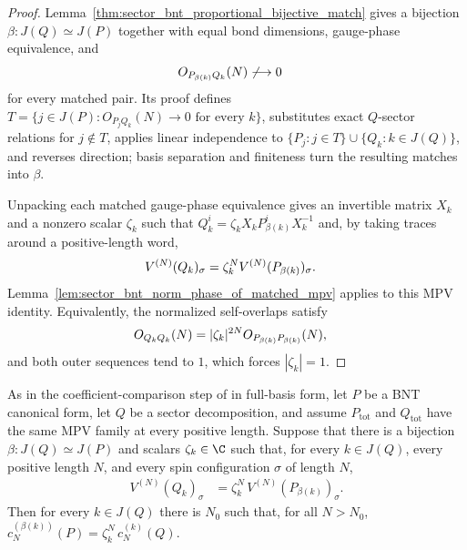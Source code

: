 \begin{proof}\leanok
    Lemma~\ref{thm:sector_bnt_proportional_bijective_match} gives a bijection
    $\beta:J(Q)\simeq J(P)$ together with equal bond dimensions, gauge-phase
    equivalence, and
    \begin{align}
        O_{P_{\beta(k)}Q_k}(N)
         & \not\longrightarrow 0
        \notag
    \end{align}
    for every matched pair. Its proof defines
    $T=\{j\in J(P):O_{P_jQ_k}(N)\to0\text{ for every }k\}$, substitutes exact
    $Q$-sector relations for $j\notin T$, applies linear independence to
    $\{P_j:j\in T\}\cup\{Q_k:k\in J(Q)\}$, and reverses direction; basis
    separation and finiteness turn the resulting matches into $\beta$.

    Unpacking each matched gauge-phase equivalence gives an invertible matrix
    $X_k$ and a nonzero scalar $\zeta_k$ such that
    $Q_k^i=\zeta_kX_kP_{\beta(k)}^iX_k^{-1}$ and, by taking traces around a
    positive-length word,
    \begin{align}
        V^{(N)}(Q_k)_\sigma
         & =\zeta_k^N V^{(N)}(P_{\beta(k)})_\sigma.
        \notag
    \end{align}
    Lemma~\ref{lem:sector_bnt_norm_phase_of_matched_mpv} applies to this MPV
    identity. Equivalently, the normalized self-overlaps satisfy
    \begin{align}
        O_{Q_kQ_k}(N)
         & =|\zeta_k|^{2N}O_{P_{\beta(k)}P_{\beta(k)}}(N),
        \notag
    \end{align}
    and both outer sequences tend to $1$, which forces $|\zeta_k|=1$.
\end{proof}

\begin{lemma}%
    \label{lem:sector_bnt_coeff_identity_via_matched_mpv_phase}
    \leanok
    As in the coefficient-comparison step of
    \cite[Appendix MPV proof, lines~1187--1188]{Cirac2016MPDO_arXiv} in
    full-basis form, let $P$ be a BNT canonical form, let $Q$ be a sector
    decomposition, and assume $P_{\mathrm{tot}}$ and $Q_{\mathrm{tot}}$ have
    the same MPV family at every positive length.
    Suppose that there is a bijection $\beta:J(Q)\simeq J(P)$ and scalars
    $\zeta_k \in \C$ such that, for every $k \in J(Q)$, every positive length
    $N$, and every spin configuration $\sigma$ of length $N$,
    \begin{align}
        V^{(N)}(Q_k)_\sigma
         & = \zeta_k^N\,V^{(N)}(P_{\beta(k)})_\sigma.
        \label{eq:ft_phase_relation_hyp}
    \end{align}
    Then for every $k \in J(Q)$ there is $N_0$ such that, for all $N>N_0$,
    $c_N^{(\beta(k))}(P)=\zeta_k^N\,c_N^{(k)}(Q)$.
\end{lemma}

